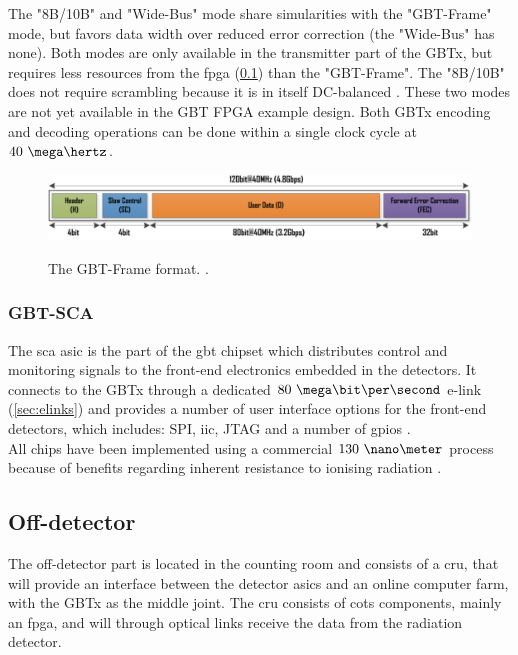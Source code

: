 \documentclass[main.tex]{subfiles}
\begin{document}
The "8B/10B" and "Wide-Bus" mode share simularities with the "GBT-Frame" mode, but favors data width over reduced error correction (the "Wide-Bus" has none). Both modes are only available in the transmitter part of the GBTx, but requires less resources from the \gls{fpga} (\ref{sec:offdetect}) than the "GBT-Frame". The "8B/10B" does not require scrambling because it is in itself DC-balanced \cite{gbtxman11}. These two modes are not yet available in the GBT FPGA example design. Both GBTx encoding and decoding operations can be done within a single clock cycle at $40~\mega\hertz$. 
 
\begin{figure} %
\includegraphics[width=\linewidth]{../img/gbtframe}  \\[0.1 cm]
\caption{The GBT-Frame format. \cite[Figure 4]{gbt_fpga}.}
\label{fig:gbtframe}
\end{figure}

\subsubsection{GBT-SCA}

The \gls{sca} \gls{asic} is the part of the \gls{gbt} chipset which distributes control and monitoring signals to the front-end electronics embedded in the detectors. It connects to the GBTx through a dedicated $80~\mega\bit\per\second$ e-link (\ref{sec:elinks}) and provides a number of user interface options for the front-end detectors, which includes: SPI, \acrshort{iic}, JTAG and a number of \acrshort{gpio}s \cite{gbtsca15}. \\

\noindent
All chips have been implemented using a commercial $130~\nano\meter$ process because of benefits regarding inherent resistance to ionising radiation \cite{gbtpro10}.

\subsection{Off-detector} \label{sec:offdetect}
The off-detector part is located in the counting room and consists of a \gls{cru}, that will provide an interface between the detector \acrshort{asic}s and an online computer farm, with the GBTx as the middle joint. The \gls{cru} consists of \gls{cots} components, mainly an \gls{fpga}, and will through optical links receive the data from the radiation detector.
\end{document}

